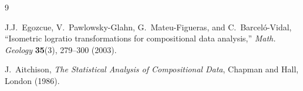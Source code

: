 \documentclass[11pt]{article}
\begin{document}
\begin{thebibliography}{9}

J.J.~Egozcue, V.~Pawlowsky-Glahn, G.~Mateu-Figueras, and
C.~Barcel\'o-Vidal,
``Isometric logratio transformations for compositional data analysis,''
\emph{Math. Geology} \textbf{35}(3), 279--300 (2003).

J.~Aitchison,
\emph{The Statistical Analysis of Compositional Data},
Chapman and Hall, London (1986).

\end{thebibliography}
\end{document}
